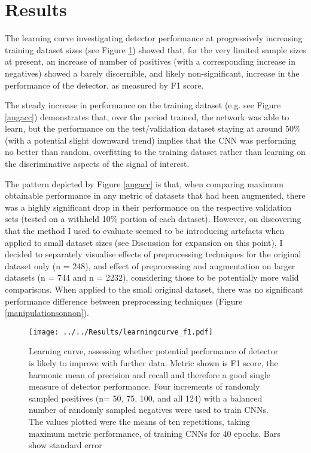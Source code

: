 \documentclass[11pt]{article}
\begin{document}
\section{Results}

The learning curve investigating detector performance at progressively increasing training dataset sizes (see Figure \ref{learningcurve}) showed that, for the very limited sample sizes at present, an increase of number of positives (with a corresponding increase in negatives) showed a barely discernible, and likely non-significant, increase in the performance of the detector, as measured by F1 score.

The steady increase in performance on the training dataset (e.g. see Figure \ref{augacc}) demonstrates that, over the period trained, the network was able to learn, but the performance on the test/validation dataset staying at around 50\% (with a potential slight downward trend) implies that the CNN was performing no better than random, overfitting to the training dataset rather than learning on the discriminative aspects of the signal of interest. 

The pattern depicted by Figure \ref{augacc} is that, when comparing maximum obtainable performance in any metric of datasets that had been augmented, there was a highly significant drop in their performance on the respective validation sets (tested on a withheld 10\% portion of each dataset). However, on discovering that the method I used to evaluate seemed to be introducing artefacts when applied to small dataset sizes (see Discussion for expansion on this point), I decided to separately visualise effects of preprocessing techniques for the original dataset only (n = 248), and effect of preprocessing and augmentation on larger datasets (n = 744 and n = 2232), considering those to be potentially more valid comparisons. When applied to the small original dataset, there was no significant performance difference between preprocessing techniques (Figure \ref{manipulationsonnon}).   

\begin{figure}[h!]
	\centering
	\texttt{[image: ../../Results/learningcurve\_f1.pdf]}
	\caption{Learning curve, assessing whether potential performance of detector is likely to improve with further data. Metric shown is F1 score, the harmonic mean of precision and recall and therefore a good single measure of detector performance. Four increments of randomly sampled positives (n= 50, 75, 100, and all 124) with a balanced number of randomly sampled negatives were used to train CNNs. The values plotted were the means of ten repetitions, taking maximum metric performance, of training CNNs for 40 epochs. Bars show standard error}
	\label{learningcurve}
\end{figure}  
\end{document}
